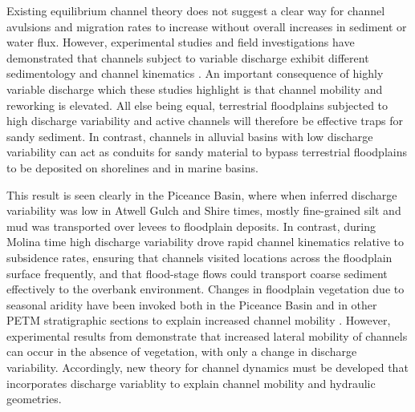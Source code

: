 \documentclass[draft]{compact_proposal}\usepackage[]{graphicx}\usepackage[]{color}
\begin{document}
Existing equilibrium channel theory does not suggest a clear way for channel avulsions and migration rates to increase without overall increases in sediment or water flux. 
However, experimental studies and field investigations have demonstrated that channels subject to variable discharge exhibit different sedimentology and channel kinematics \parencite{esposito_sediment_2018, fielding_role_2018}.
An important consequence of highly variable discharge which these studies highlight is that channel mobility and reworking is elevated.
All else being equal, terrestrial floodplains subjected to high discharge variability and active channels will therefore be effective traps for sandy sediment.
In contrast, channels in alluvial basins with low discharge variability can act as conduits for sandy material to bypass terrestrial floodplains to be deposited on shorelines and in marine basins. 

This result is seen clearly in the Piceance Basin, where when inferred discharge variability was low in Atwell Gulch and Shire times, mostly fine-grained silt and mud was transported over levees to floodplain deposits.
In contrast, during Molina time high discharge variability drove rapid channel kinematics relative to subsidence rates, ensuring that channels visited locations across the floodplain surface frequently, and that flood-stage flows could transport coarse sediment effectively to the overbank environment.
Changes in floodplain vegetation due to seasonal aridity have been invoked both in the Piceance Basin and in other PETM stratigraphic sections to explain increased channel mobility \parencite{foreman_fluvial_2012, wing_plant_2013}.
However, experimental results from \textcite{esposito_sediment_2018} demonstrate that increased lateral mobility of channels can occur in the absence of vegetation, with only a change in discharge variability.
Accordingly, new theory for channel dynamics must be developed that incorporates discharge variablity to explain channel mobility and hydraulic geometries. 


\end{document}
